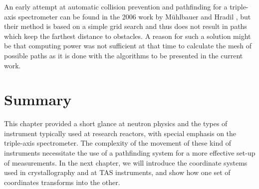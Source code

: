An early attempt at automatic collision prevention and pathfinding for a triple-axis spectrometer can be found in
the 2006 work by M\"uhlbauer and Hradil \cite{Muehlbauer2006}, but their method is based on a simple grid search and thus
does not result in paths which keep the farthest distance to obstacles. A reason for such a solution might be
that computing power was not sufficient at that time to calculate the mesh of possible paths as it is 
done with the algorithms to be presented in the current work.



\section{Summary}

This chapter provided a short glance at neutron physics and the types of instrument typically used at research
reactors, with special emphasis on the triple-axis spectrometer. The complexity of the movement of these kind of
instruments necessitate the use of a pathfinding system for a more effective set-up of measurements.
In the next chapter, we will introduce the coordinate systems used in crystallography and at TAS instruments,
and show how one set of coordinates transforms into the other.
